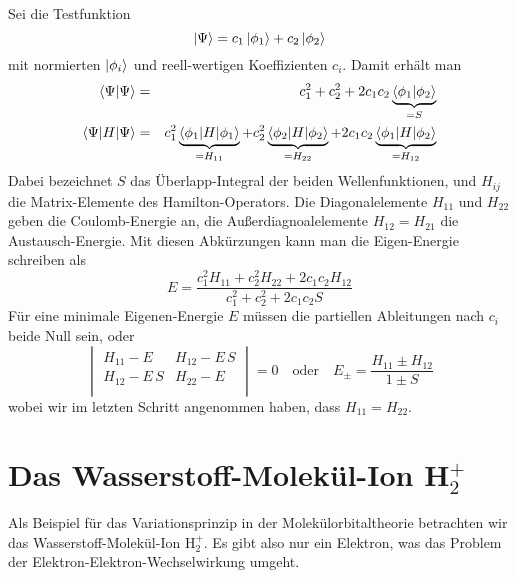 Sei die Testfunktion
\begin{equation}
 \ket{\Psi} = c_1 \ket{\phi_1} + c_2 \ket{\phi_2}
\end{equation}
mit normierten  $\ket{\phi_i}$ und reell-wertigen Koeffizienten $c_i$. Damit erhält man
\begin{eqnarray}
\braket{\Psi | \Psi}  &= & c_1^2 + c_2^2  + 2 c_1 c_2 \underbrace{\braket{\phi_1 | \phi_2}}_{= S}\\
\braket{\Psi |  H | \Psi} &=& c_1^2 \underbrace{\braket{\phi_1 |  H | \phi_1 }}_{= H_{11}} +
										c_2^2 \underbrace{\braket{\phi_2 |  H | \phi_2 }}_{= H_{22}} +
								2 c_1 c_2 \underbrace{\braket{\phi_1 |  H | \phi_2 }}_{= H_{12}} 
\end{eqnarray}
Dabei bezeichnet $S$ das Überlapp-Integral der beiden Wellenfunktionen, und $H_{ij}$ die Matrix-Elemente des Hamilton-Operators. Die Diagonalelemente $H_{11}$ und $H_{22}$ geben die Coulomb-Energie an, die Außerdiagnoalelemente $H_{12} = H_{21}$ die Austausch-Energie. Mit diesen Abkürzungen kann man die Eigen-Energie schreiben als
\begin{equation}
  E = \frac{c_1^2 H_{11} + c_2^2 H_{22} + 2 c_1 c_2 H_{12}}{c_1^2 + c_2^2 + 2 c_1 c_2 S}  \label{eq:MO_e_variation}
\end{equation}
Für eine minimale Eigenen-Energie $E$ müssen die partiellen Ableitungen nach $c_i$ beide Null sein, oder
\begin{equation}
 \begin{vmatrix}
   H_{11} - E & H_{12} - E \, S \\  H_{12} - E \, S & H_{22} - E \\
 \end{vmatrix}
= 0
\quad
\text{oder} \quad
E_\pm = \frac{H_{11} \pm H_{12}}{1 \pm S}
\end{equation}
wobei wir im letzten Schritt angenommen haben, dass $H_{11} = H_{22}$.

\section{Das Wasserstoff-Molekül-Ion H$_2^+$}

Als Beispiel für das Variationsprinzip in der Molekülorbitaltheorie betrachten wir das Wasserstoff-Molekül-Ion H$_2^+$. Es gibt also nur ein Elektron, was das Problem der Elektron-Elektron-Wechselwirkung umgeht.


